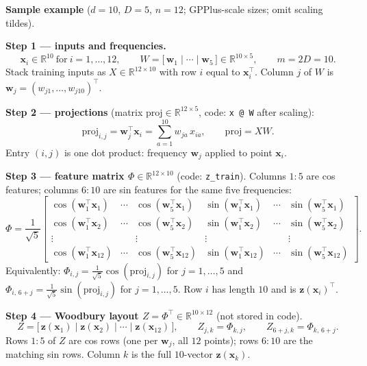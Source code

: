\documentclass[11pt]{article}
\newcommand{\Ph}{\Phi}
\newcommand{\Zmat}{Z}
\begin{document}
\begin{samebox}
\textbf{Sample example} ($d=10$, $D=5$, $n=12$; GPPlus-scale sizes; omit scaling tildes).

\medskip
\noindent\textbf{Step 1 --- inputs and frequencies.}
\[
  \mathbf x_i \in \mathbb{R}^{10}\ \text{for}\ i=1,\ldots,12,
  \qquad
  W = \bigl[\,\mathbf w_1 \;\big|\;\cdots\;\big|\;\mathbf w_5\,\bigr] \in \mathbb{R}^{10 \times 5},
  \qquad
  m = 2D = 10.
\]
Stack training inputs as $X\in\mathbb{R}^{12 \times 10}$ with row $i$ equal to $\mathbf x_i^{\top}$.
Column $j$ of $W$ is $\mathbf w_j=(w_{j1},\ldots,w_{j10})^{\top}$.

\medskip
\noindent\textbf{Step 2 --- projections} (matrix $\mathrm{proj}\in\mathbb{R}^{12 \times 5}$, code: \texttt{x @ W} after scaling):
\[
  \mathrm{proj}_{i,j}
  = \mathbf w_j^{\top}\mathbf x_i
  = \sum_{a=1}^{10} w_{ja}\,x_{ia},
  \qquad
  \mathrm{proj} = X W.
\]
Entry $(i,j)$ is one dot product: frequency $\mathbf w_j$ applied to point $\mathbf x_i$.

\medskip
\noindent\textbf{Step 3 --- feature matrix $\Ph\in\mathbb{R}^{12 \times 10}$} (code: \texttt{z\_train}).
Columns $1{:}5$ are cos features; columns $6{:}10$ are sin features for the same five frequencies:
\[
  \Ph
  = \frac{1}{\sqrt{5}}
  \begin{bmatrix}
    \cos(\mathbf w_1^{\top}\mathbf x_1) & \cdots & \cos(\mathbf w_5^{\top}\mathbf x_1) &
    \sin(\mathbf w_1^{\top}\mathbf x_1) & \cdots & \sin(\mathbf w_5^{\top}\mathbf x_1) \\[3pt]
    \cos(\mathbf w_1^{\top}\mathbf x_2) & \cdots & \cos(\mathbf w_5^{\top}\mathbf x_2) &
    \sin(\mathbf w_1^{\top}\mathbf x_2) & \cdots & \sin(\mathbf w_5^{\top}\mathbf x_2) \\
    \vdots & & \vdots & \vdots & & \vdots \\
    \cos(\mathbf w_1^{\top}\mathbf x_{12}) & \cdots & \cos(\mathbf w_5^{\top}\mathbf x_{12}) &
    \sin(\mathbf w_1^{\top}\mathbf x_{12}) & \cdots & \sin(\mathbf w_5^{\top}\mathbf x_{12})
  \end{bmatrix}.
\]
Equivalently: $\Ph_{i,j}=\frac{1}{\sqrt{5}}\cos(\mathrm{proj}_{i,j})$ for $j=1,\ldots,5$ and
$\Ph_{i,\,6+j}=\frac{1}{\sqrt{5}}\sin(\mathrm{proj}_{i,j})$ for $j=1,\ldots,5$.
Row $i$ has length $10$ and is $\mathbf z(\mathbf x_i)^{\top}$.

\medskip
\noindent\textbf{Step 4 --- Woodbury layout $\Zmat=\Ph^{\top}\in\mathbb{R}^{10 \times 12}$} (not stored in code).
\[
  \Zmat =
  \bigl[\,
    \mathbf z(\mathbf x_1)
    \;\big|\;
    \mathbf z(\mathbf x_2)
    \;\big|\;
    \cdots
    \;\big|\;
    \mathbf z(\mathbf x_{12})
  \,\bigr],
  \qquad
  \Zmat_{j,k}=\Ph_{k,j},
  \qquad
  \Zmat_{6+j,k}=\Ph_{k,\,6+j}.
\]
Rows $1{:}5$ of $\Zmat$ are cos rows (one per $\mathbf w_j$, all $12$ points); rows $6{:}10$ are the matching sin rows.
Column $k$ is the full $10$-vector $\mathbf z(\mathbf x_k)$.


\end{samebox}
\end{document}
